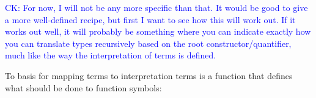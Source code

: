 \documentclass[runningheads,a4paper]{llncs}
\newcommand{\TypeConstructors}{\mathcal{C}}
\newcommand{\TypeQuantifiers}{\mathcal{Q}}
\newcommand{\Typemap}{\mathcal{T\!M}}
\newcommand{\quant}[2]{\forall #1[#2]}
\newcommand{\qquant}[3]{#1 #2[#3]}
\newcommand{\arrtype}{\Rightarrow}
\newcommand{\FTV}{\mathit{FTV}}
\newcommand{\con}{\mathtt{c}}
\newcommand{\CK}[1]{\textcolor{blue}{CK: #1}}
\begin{document}
\begin{definition}
\CK{For now, I will not be any more specific than that.  It would be
  good to give a more well-defined recipe, but first I want to see how
  this will work out.  If it works out well, it will probably be
  something where you can indicate exactly how you can translate types
  recursively based on the root constructor/quantifier, much like the
  way the interpretation of terms is defined.}
%
\end{definition}

To basis for mapping terms to interpretation terms is a function that
defines what should be done to function symbols:
\end{document}
